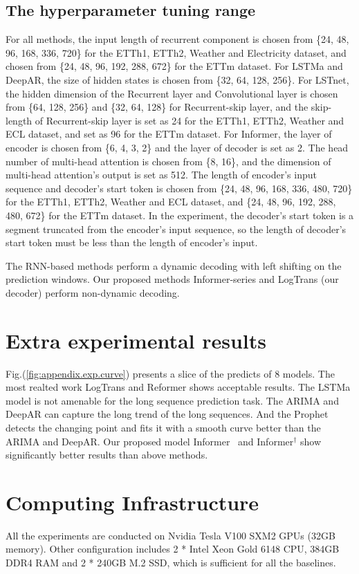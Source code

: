 \documentclass[letterpaper]{article} %
\newcommand{\mn}{Informer}
\begin{document}
\begin{appendices}
\subsection{The hyperparameter tuning range}
\label{sec:appendix.range}
For all methods, the input length of recurrent component is chosen from \{24, 48, 96, 168, 336, 720\} for the ETTh1, ETTh2, Weather and Electricity dataset, and chosen from \{24, 48, 96, 192, 288, 672\} for the ETTm dataset. 
For LSTMa and DeepAR, the size of hidden states is chosen from \{32, 64, 128, 256\}. 
For LSTnet, the hidden dimension of the Recurrent layer and Convolutional layer is chosen from \{64, 128, 256\} and \{32, 64, 128\} for Recurrent-skip layer, and the skip-length of Recurrent-skip layer is set as 24 for the ETTh1, ETTh2, Weather and ECL dataset, and set as 96 for the ETTm dataset.
For {\mn}, the layer of encoder is chosen from \{6, 4, 3, 2\} and the layer of decoder is set as 2. The head number of multi-head attention is chosen from \{8, 16\}, and the dimension of multi-head attention’s output is set as 512. The length of encoder’s input sequence and decoder’s start token is chosen from \{24, 48, 96, 168, 336, 480, 720\} for the ETTh1, ETTh2, Weather and ECL dataset, and \{24, 48, 96, 192, 288, 480, 672\} for the ETTm dataset. In the experiment, the decoder’s start token is a segment truncated from the encoder’s input sequence, so the length of decoder’s start token must be less than the length of encoder’s input.

The RNN-based methods perform a dynamic decoding with left shifting on the prediction windows. Our proposed methods \mn-series and LogTrans (our decoder) perform non-dynamic decoding.


\section{Extra experimental results}

Fig.(\ref{fig:appendix.exp.curve}) presents a slice of the predicts of 8 models. The most realted work LogTrans and Reformer shows acceptable results. The LSTMa model is not amenable for the long sequence prediction task. The ARIMA and DeepAR can capture the long trend of the long sequences. And the Prophet detects the changing point and fits it with a smooth curve better than the ARIMA and DeepAR. Our proposed model \mn~ and \mn$^{\dag}$ show significantly better results than above methods.

\section{Computing Infrastructure}
All the experiments are conducted on Nvidia Tesla V100 SXM2 GPUs (32GB memory). Other configuration includes 2 * Intel Xeon Gold 6148 CPU, 384GB DDR4 RAM and 2 * 240GB M.2 SSD, which is sufficient for all the baselines. 

\end{appendices}


\end{document}
